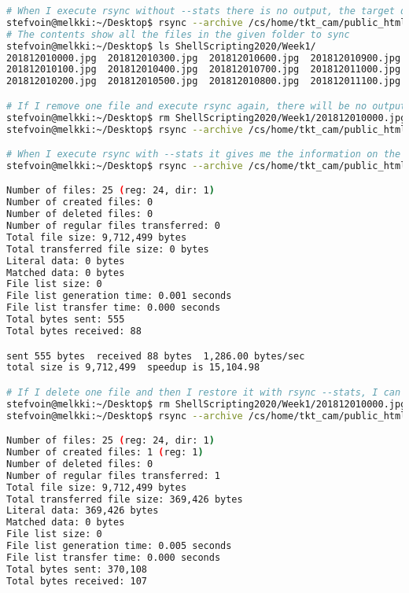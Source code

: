 \documentclass[9pt]{article}
\begin{document}
\begin{enumerate}
\begin{lstlisting}[language=bash,breaklines=true]
# When I execute rsync without --stats there is no output, the target directory is just populated
stefvoin@melkki:~/Desktop$ rsync --archive /cs/home/tkt_cam/public_html/2018/12/01/ ShellScripting2020/Week1/
# The contents show all the files in the given folder to sync
stefvoin@melkki:~/Desktop$ ls ShellScripting2020/Week1/
201812010000.jpg  201812010300.jpg  201812010600.jpg  201812010900.jpg  201812011200.jpg  201812011500.jpg  201812011800.jpg  201812012100.jpg
201812010100.jpg  201812010400.jpg  201812010700.jpg  201812011000.jpg  201812011300.jpg  201812011600.jpg  201812011900.jpg  201812012200.jpg
201812010200.jpg  201812010500.jpg  201812010800.jpg  201812011100.jpg  201812011400.jpg  201812011700.jpg  201812012000.jpg  201812012300.jpg

# If I remove one file and execute rsync again, there will be no output, the missing file will just be restored
stefvoin@melkki:~/Desktop$ rm ShellScripting2020/Week1/201812010000.jpg 
stefvoin@melkki:~/Desktop$ rsync --archive /cs/home/tkt_cam/public_html/2018/12/01/ ShellScripting2020/Week1/

# When I execute rsync with --stats it gives me the information on the difference between the two directories
stefvoin@melkki:~/Desktop$ rsync --archive /cs/home/tkt_cam/public_html/2018/12/01/ ShellScripting2020/Week1/ --stats

Number of files: 25 (reg: 24, dir: 1)
Number of created files: 0
Number of deleted files: 0
Number of regular files transferred: 0
Total file size: 9,712,499 bytes
Total transferred file size: 0 bytes
Literal data: 0 bytes
Matched data: 0 bytes
File list size: 0
File list generation time: 0.001 seconds
File list transfer time: 0.000 seconds
Total bytes sent: 555
Total bytes received: 88

sent 555 bytes  received 88 bytes  1,286.00 bytes/sec
total size is 9,712,499  speedup is 15,104.98

# If I delete one file and then I restore it with rsync --stats, I can see that it tells me the information about the operation
stefvoin@melkki:~/Desktop$ rm ShellScripting2020/Week1/201812010000.jpg 
stefvoin@melkki:~/Desktop$ rsync --archive /cs/home/tkt_cam/public_html/2018/12/01/ ShellScripting2020/Week1/ --stats

Number of files: 25 (reg: 24, dir: 1)
Number of created files: 1 (reg: 1)
Number of deleted files: 0
Number of regular files transferred: 1
Total file size: 9,712,499 bytes
Total transferred file size: 369,426 bytes
Literal data: 369,426 bytes
Matched data: 0 bytes
File list size: 0
File list generation time: 0.005 seconds
File list transfer time: 0.000 seconds
Total bytes sent: 370,108
Total bytes received: 107


\end{lstlisting}
\end{enumerate}
\end{document}
